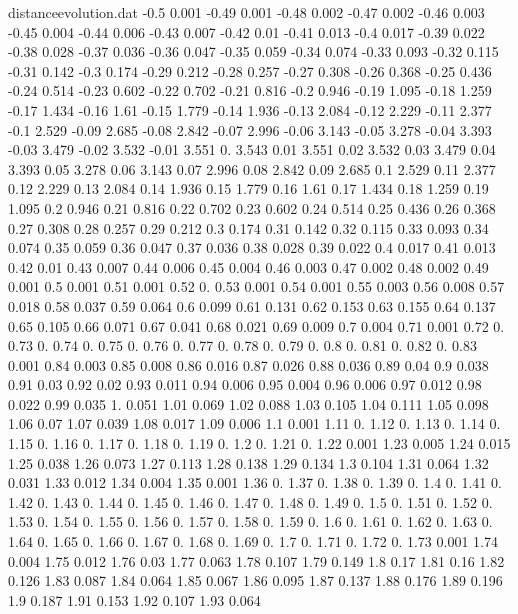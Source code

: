 \documentclass[a4paper,12pt,listof=totoc,index=totoc,bibliography=totoc,headsepline=false,headings=normal,BCOR16.153846mm,DIV12,headinclude,twoside,cleardoublepage=empty,numbers=noenddot,final]{scrreprt}
\theoremstyle{mystyle}
\numberwithin{equation}{section}
\numberwithin{figure}{section}
\numberwithin{lemma}{section}
\numberwithin{theorem}{section}
\numberwithin{corollary}{section}
\numberwithin{definition}{section}
\numberwithin{conjecture}{section}
\numberwithin{observation}{section}
\newcommand{\+}{\mkern2mu}
\DeclareMathOperator{\1}{\mathds{1}}
\begin{document}
\begin{filecontents}{distanceevolution.dat}
-0.5	0.001
-0.49	0.001
-0.48	0.002
-0.47	0.002
-0.46	0.003
-0.45	0.004
-0.44	0.006
-0.43	0.007
-0.42	0.01
-0.41	0.013
-0.4	0.017
-0.39	0.022
-0.38	0.028
-0.37	0.036
-0.36	0.047
-0.35	0.059
-0.34	0.074
-0.33	0.093
-0.32	0.115
-0.31	0.142
-0.3	0.174
-0.29	0.212
-0.28	0.257
-0.27	0.308
-0.26	0.368
-0.25	0.436
-0.24	0.514
-0.23	0.602
-0.22	0.702
-0.21	0.816
-0.2	0.946
-0.19	1.095
-0.18	1.259
-0.17	1.434
-0.16	1.61
-0.15	1.779
-0.14	1.936
-0.13	2.084
-0.12	2.229
-0.11	2.377
-0.1	2.529
-0.09	2.685
-0.08	2.842
-0.07	2.996
-0.06	3.143
-0.05	3.278
-0.04	3.393
-0.03	3.479
-0.02	3.532
-0.01	3.551
  0.	3.543
0.01	3.551
0.02	3.532
0.03	3.479
0.04	3.393
0.05	3.278
0.06	3.143
0.07	2.996
0.08	2.842
0.09	2.685
0.1	2.529
0.11	2.377
0.12	2.229
0.13	2.084
0.14	1.936
0.15	1.779
0.16	1.61
0.17	1.434
0.18	1.259
0.19	1.095
0.2	0.946
0.21	0.816
0.22	0.702
0.23	0.602
0.24	0.514
0.25	0.436
0.26	0.368
0.27	0.308
0.28	0.257
0.29	0.212
0.3	0.174
0.31	0.142
0.32	0.115
0.33	0.093
0.34	0.074
0.35	0.059
0.36	0.047
0.37	0.036
0.38	0.028
0.39	0.022
0.4	0.017
0.41	0.013
0.42	0.01
0.43	0.007
0.44	0.006
0.45	0.004
0.46	0.003
0.47	0.002
0.48	0.002
0.49	0.001
0.5	0.001
0.51	0.001
0.52	0.
0.53	0.001
0.54	0.001
0.55	0.003
0.56	0.008
0.57	0.018
0.58	0.037
0.59	0.064
0.6	0.099
0.61	0.131
0.62	0.153
0.63	0.155
0.64	0.137
0.65	0.105
0.66	0.071
0.67	0.041
0.68	0.021
0.69	0.009
0.7	0.004
0.71	0.001
0.72	0.
0.73	0.
0.74	0.
0.75	0.
0.76	0.
0.77	0.
0.78	0.
0.79	0.
0.8	0.
0.81	0.
0.82	0.
0.83	0.001
0.84	0.003
0.85	0.008
0.86	0.016
0.87	0.026
0.88	0.036
0.89	0.04
0.9	0.038
0.91	0.03
0.92	0.02
0.93	0.011
0.94	0.006
0.95	0.004
0.96	0.006
0.97	0.012
0.98	0.022
0.99	0.035
1.	0.051
1.01	0.069
1.02	0.088
1.03	0.105
1.04	0.111
1.05	0.098
1.06	0.07
1.07	0.039
1.08	0.017
1.09	0.006
1.1	0.001
1.11	0.
1.12	0.
1.13	0.
1.14	0.
1.15	0.
1.16	0.
1.17	0.
1.18	0.
1.19	0.
1.2	0.
1.21	0.
1.22	0.001
1.23	0.005
1.24	0.015
1.25	0.038
1.26	0.073
1.27	0.113
1.28	0.138
1.29	0.134
1.3	0.104
1.31	0.064
1.32	0.031
1.33	0.012
1.34	0.004
1.35	0.001
1.36	0.
1.37	0.
1.38	0.
1.39	0.
1.4	0.
1.41	0.
1.42	0.
1.43	0.
1.44	0.
1.45	0.
1.46	0.
1.47	0.
1.48	0.
1.49	0.
1.5	0.
1.51	0.
1.52	0.
1.53	0.
1.54	0.
1.55	0.
1.56	0.
1.57	0.
1.58	0.
1.59	0.
1.6	0.
1.61	0.
1.62	0.
1.63	0.
1.64	0.
1.65	0.
1.66	0.
1.67	0.
1.68	0.
1.69	0.
1.7	0.
1.71	0.
1.72	0.
1.73	0.001
1.74	0.004
1.75	0.012
1.76	0.03
1.77	0.063
1.78	0.107
1.79	0.149
1.8	0.17
1.81	0.16
1.82	0.126
1.83	0.087
1.84	0.064
1.85	0.067
1.86	0.095
1.87	0.137
1.88	0.176
1.89	0.196
1.9	0.187
1.91	0.153
1.92	0.107
1.93	0.064

\end{filecontents}
\end{document}

